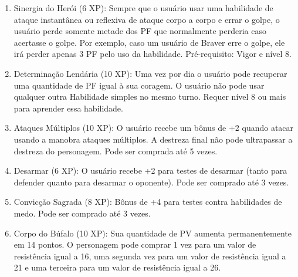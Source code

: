 \begin{enumerate}
	\item Sinergia do Herói (6 XP): Sempre que o usuário usar uma habilidade de ataque instantânea ou reflexiva de ataque corpo a corpo e errar o golpe, o usuário perde somente metade dos PF que normalmente perderia caso acertasse o golpe. Por exemplo, caso um usuário de Braver erre o golpe, ele irá perder apenas 3 PF pelo uso da habilidade. Pré-requisito: Vigor e nível 8.

	\item Determinação Lendária (10 XP): Uma vez por dia o usuário pode recuperar uma quantidade de PF igual à sua coragem. O usuário não pode usar qualquer outra Habilidade simples no mesmo turno. Requer nível 8 ou mais para aprender essa habilidade. 

	\item Ataques Múltiplos (10 XP): O usuário recebe um bônus de +2 quando atacar usando a manobra ataques múltiplos. A destreza final não pode ultrapassar a destreza do personagem. Pode ser comprada até 5 vezes. 	

	
  	\item Desarmar (6 XP): O usuário recebe +2 para testes de desarmar (tanto para defender quanto para desarmar o oponente). Pode ser comprado até 3 vezes.
	
	\item Convicção Sagrada (8 XP): Bônus de +4 para testes contra habilidades de medo. Pode ser comprado até 3 vezes.

    \item Corpo do Búfalo (10 XP): Sua quantidade de PV aumenta permanentemente em 14 pontos. O personagem pode comprar 1 vez para um valor de resistência igual a 16, uma segunda vez para um valor de resistência igual a 21 e uma terceira para um valor de resistência igual a 26.
	
	
	
\end{enumerate}

